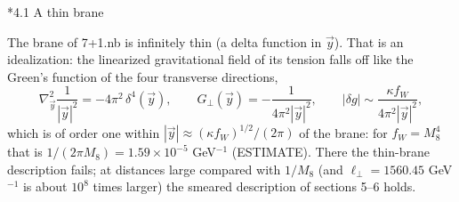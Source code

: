 \documentclass[10pt,a4paper]{article}
\makeatletter
\renewcommand\subsection{\@startsection{subsection}{2}{\z@}{-3.25ex\@plus -1ex \@minus -.2ex}{1.5ex \@plus .2ex}{\normalfont\large\bfseries\raggedright}}
\makeatother
\begin{document}
\subsection*{4.1 A thin brane}
The brane of 7+1.nb is infinitely thin (a delta function in $\vec y$). That is an idealization: the linearized gravitational field of its tension falls off like the Green’s function of the four transverse directions,
\begin{equation*}
\nabla_{\vec y}^2\frac1{|\vec y|^2}=-4\pi^2\,\delta^4(\vec y),\qquad G_\perp(\vec y)=-\frac1{4\pi^2|\vec y|^2},\qquad |\delta g|\sim\frac{\kappa f_W}{4\pi^2|\vec y|^2},
\end{equation*}
which is of order one within $|\vec y|\approx(\kappa f_W)^{1/2}/(2\pi)$ of the brane: for $f_W=M_8^4$ that is $1/(2\pi M_8)=1.59\times10^{-5}$ GeV$^{-1}$ (ESTIMATE). There the thin-brane description fails; at distances large compared with $1/M_8$ (and $\ell_\perp=1560.45$ GeV$^{-1}$ is about $10^8$ times larger) the smeared description of sections 5–6 holds.
\end{document}
